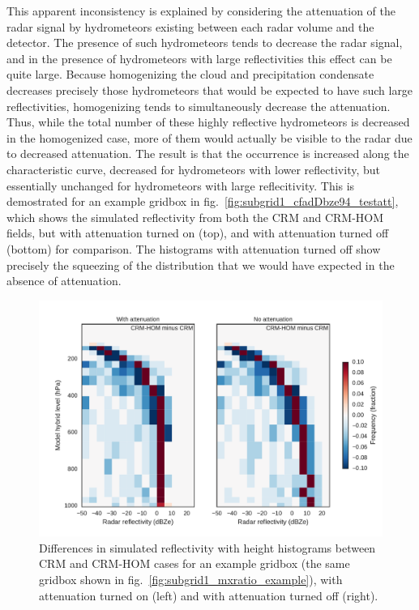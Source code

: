 This apparent inconsistency is explained by considering the attenuation
of the radar signal by hydrometeors existing between each radar volume
and the detector. The presence of such hydrometeors tends to decrease
the radar signal, and in the presence of hydrometeors with large
reflectivities this effect can be quite large. Because homogenizing the
cloud and precipitation condensate decreases precisely those
hydrometeors that would be expected to have such large reflectivities,
homogenizing tends to simultaneously decrease the attenuation. Thus,
while the total number of these highly reflective hydrometeors is
decreased in the homogenized case, more of them would actually be
visible to the radar due to decreased attenuation. The result is that
the occurrence is increased along the characteristic curve, decreased
for hydrometeors with lower reflectivity, but essentially unchanged for
hydrometeors with large reflecitivity. This is demostrated for an
example gridbox in fig.~\ref{fig:subgrid1_cfadDbze94_testatt}, which
shows the simulated reflectivity from both the CRM and CRM-HOM fields,
but with attenuation turned on (top), and with attenuation turned off
(bottom) for comparison. The histograms with attenuation turned off show
precisely the squeezing of the distribution that we would have expected
in the absence of attenuation.

\begin{figure}[htbp]
\centering
\includegraphics{graphics/subgrid1_cfadDbze94_att-test.pdf}
\caption{\label{fig:subgrid1_cfadDbze94_testatt}Differences in simulated
reflectivity with height histograms between CRM and CRM-HOM cases for an
example gridbox (the same gridbox shown in
fig.~\ref{fig:subgrid1_mxratio_example}), with attenuation turned on
(left) and with attenuation turned off
(right).}\label{fig:subgrid1ux5fcfadDbze94ux5ftestatt}
\end{figure}

